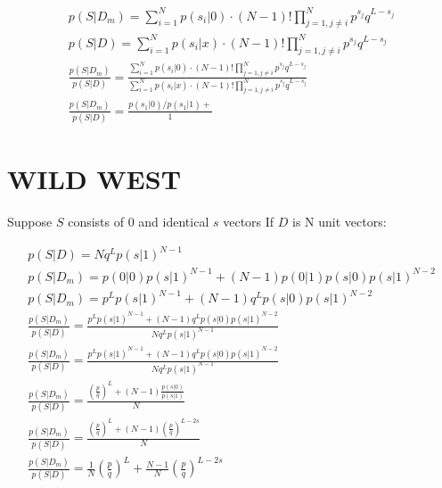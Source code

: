 \documentclass[11pt,draft]{article}
\begin{document}
\begin{align}
p(S|D_m) =  \sum_{i=1}^{N}  p(s_i |0) \cdot (N-1)!  \prod_{j=1, j \neq i}^N p^{s_j}q^{L-s_j} \\
p(S|D) =  \sum_{i=1}^{N}  p(s_i |x) \cdot (N-1)!  \prod_{j=1, j \neq i}^N p^{s_j}q^{L-s_j} \\
\frac{p(S|D_m)}{p(S|D)} = \frac { \sum_{i=1}^{N}  p(s_i |0) \cdot (N-1)!  \prod_{j=1, j \neq i}^N p^{s_j}q^{L-s_j}  } { \sum_{i=1}^{N}  p(s_i |x) \cdot (N-1)!  \prod_{j=1, j \neq i}^N p^{s_j}q^{L-s_j}  } \\
\frac{p(S|D_m)}{p(S|D)} =  \frac { p(s_1|0)/p(s_1|1) + } { 1} 
\end{align}



\section{WILD WEST}

Suppose $S$ consists of  $0$ and identical $s$ vectors 
If  $D$ is N unit vectors:

\begin{align}
p(S|D) =  Nq^Lp(s|1)^{N-1}\\
p(S|D_m) = p(0|0) p(s|1)^{N-1} + (N-1) p(0|1)p(s|0)p(s|1)^{N-2} \\
p(S|D_m) = p^Lp(s|1)^{N-1} + (N-1) q^Lp(s|0)p(s|1)^{N-2}\\
\frac{p(S|D_m)}{p(S|D)} = \frac { p^Lp(s|1)^{N-1} + (N-1) q^Lp(s|0)p(s|1)^{N-2} } {  Nq^Lp(s|1)^{N-1}}\\
\frac{p(S|D_m)}{p(S|D)} = \frac { p^Lp(s|1)^{N-1} + (N-1) q^Lp(s|0)p(s|1)^{N-2} } {  Nq^Lp(s|1)^{N-1}}\\
\frac{p(S|D_m)}{p(S|D)} = \frac {\left ( \frac{p}{q} \right )^L + (N-1) \frac{p(s|0)}{p(s|1)} } { N}\\
\frac{p(S|D_m)}{p(S|D)} = \frac {\left ( \frac{p}{q} \right )^L + (N-1)\left ( \frac{p}{q} \right )^{L-2s} } { N} \\
\frac{p(S|D_m)}{p(S|D)} = \frac{1}{N}\left ( \frac{p}{q} \right )^L + \frac{N-1}{N}\left ( \frac{p}{q} \right )^{L-2s}\\
\end{align}
\end{document}
